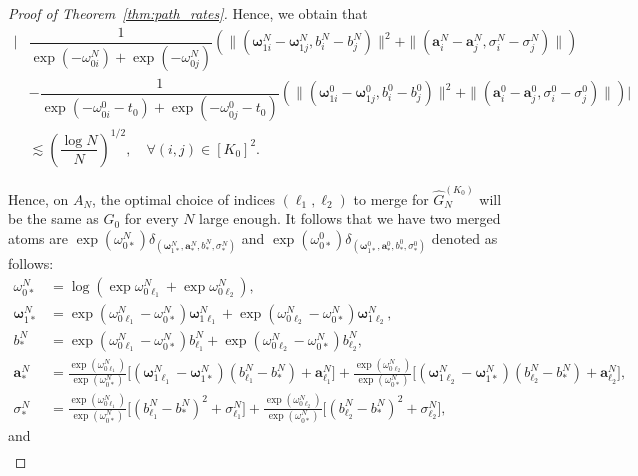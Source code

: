 \documentclass[twoside]{article}
\theoremstyle{plain}
\theoremstyle{definition}
\theoremstyle{plain}
\def\vomega{{\bm{\omega}}}
\def\va{{\bm{a}}}
\begin{document}
\begin{proof}[Proof of Theorem~\ref{thm:path_rates}]
    Hence, we obtain that 
    \begin{align}
        \Bigg| &\dfrac{1}{\exp{( -\omega^N_{0i})} + \exp{(-\omega^N_{0j})}} \left( \| (\vomega^N_{1i} - \vomega^N_{1j},   b^N_{i} - b^N_j)\|^{2} + \|( \va^N_{i} - \va^N_j, \sigma^N_{i} - \sigma^N_j)\| \right) \nonumber\\
        &- \dfrac{1}{\exp{( -\omega^0_{0i} - t_0)} + \exp{(-\omega^0_{0j} - t_0)}} \left( \| (\vomega^0_{1i} - \vomega^0_{1j},   b^0_{i} - b^0_j)\|^{2} + \|( \va^0_{i} - \va^0_j, \sigma^0_{i} - \sigma^0_j)\| \right) \Bigg| \nonumber\\
        &\lesssim \left( \dfrac{\log N}{N} \right)^{1/2}, \quad \forall (i, j) \in [K_0]^2. \label{eq:under_specified_ineq}
    \end{align}

    Hence, on $A_N$, the optimal choice of indices $(\ell_1, \ell_2)$ to merge for $\widehat{G}^{(K_0)}_N$ will be the same as $G_0$ for every $N$ large enough. It follows that we have two merged atoms are $\exp{(\omega_{0*}^N)} \delta_{(\vomega_{1*}^N, \va_*^N, b_*^N, \sigma_*^N)}$ and $\exp{(\omega_{0*}^0)} \delta_{(\vomega_{1*}^0, \va_*^0, b_*^0, \sigma_*^0)}$ denoted as follows:
    \begin{align}
    \omega_{0*}^N &= \log \left( \exp{\omega_{0\ell_1}^N} + \exp{\omega_{0\ell_2}^N} \right), \nonumber \\
    \vomega_{1*}^N &= \exp{\left(\omega_{0\ell_1}^N - \omega_{0*}^N \right)} \vomega_{1\ell_1}^N 
    + \exp{\left(\omega_{0\ell_2}^N - \omega_{0*}^N\right)} \vomega_{1\ell_2}^N, \nonumber\\
    b_*^N &= \exp{\left(\omega_{0\ell_1}^N - \omega_{0*}^N \right)} b_{\ell_1}^N 
    + \exp{\left(\omega_{0\ell_2}^N - \omega_{0*}^N\right)} b_{\ell_2}^N, \nonumber\\
    \va_*^N &= \frac{\exp(\omega_{0\ell_1}^N)}{\exp(\omega_{0*}^N)} \Big[(\vomega_{1\ell_1}^N - \vomega_{1*}^N)(b_{\ell_1}^N - b_*^N) + \va_{\ell_1}^N\Big] 
    + \frac{\exp(\omega_{0\ell_2}^N)}{\exp(\omega_{0*}^N)} \Big[(\vomega_{1\ell_2}^N - \vomega_{1*}^N)(b_{\ell_2}^N - b_*^N) + \va_{\ell_2}^N\Big], \nonumber \\
    \sigma_*^N &= \frac{\exp(\omega_{0\ell_1}^N)}{\exp(\omega_{0*}^N)} \Big[(b_{\ell_1}^N - b_*^N)^2 + \sigma_{\ell_1}^N\Big] 
    + \frac{\exp(\omega_{0\ell_2}^N)}{\exp(\omega_{0*}^N)} \Big[(b_{\ell_2}^N - b_*^N)^2 + \sigma_{\ell_2}^N\Big], \nonumber
\end{align}
    and 
    \begin{align}

\end{align}
\end{proof}
\end{document}

